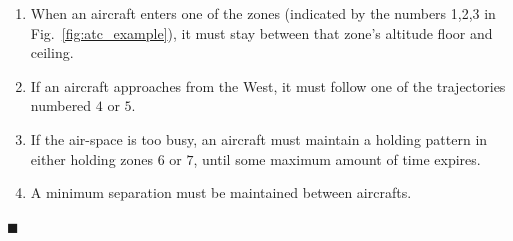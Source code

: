 \begin{enumerate}
\vspace{-5pt}
\item When an aircraft enters one of the zones (indicated by the numbers 1,2,3 in Fig.~\ref{fig:atc_example}), it must stay between that zone's altitude floor and ceiling.%
\label{rule:floor ceiling}
\vspace{-5pt}
\item If an aircraft approaches from the West, it must follow one of the trajectories numbered $4$ or $5$. 
\label{rule:waypoints}
\vspace{-5pt}
\item If the air-space is too busy, an aircraft must maintain a holding pattern in either holding zones $6$ or $7$, until some maximum amount of time expires.
\label{rule:holding}
\vspace{-5pt}
\item A minimum separation must be maintained between aircrafts.
\vspace{-5pt}
\end{enumerate}
\begin{flushright} $\blacksquare$ \end{flushright}